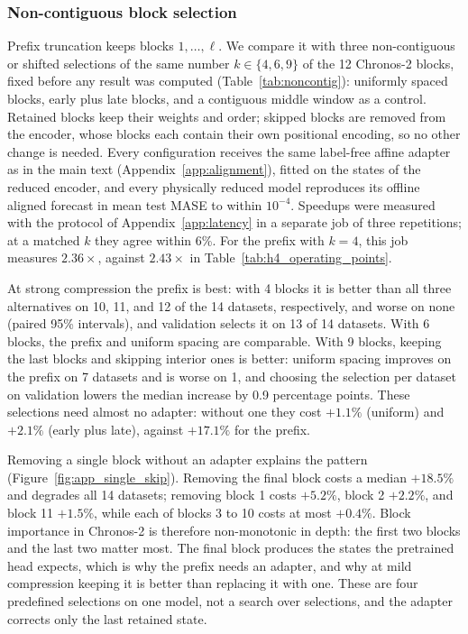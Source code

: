 
\subsubsection{Non-contiguous block selection}
\label{sec:app_noncontig}

Prefix truncation keeps blocks $1,\dots,\ell$. We compare it with three non-contiguous or shifted selections of the same number $k\in\{4,6,9\}$ of the 12 Chronos-2 blocks, fixed before any result was computed (Table~\ref{tab:noncontig}): uniformly spaced blocks, early plus late blocks, and a contiguous middle window as a control. Retained blocks keep their weights and order; skipped blocks are removed from the encoder, whose blocks each contain their own positional encoding, so no other change is needed. Every configuration receives the same label-free affine adapter as in the main text (Appendix~\ref{app:alignment}), fitted on the states of the reduced encoder, and every physically reduced model reproduces its offline aligned forecast in mean test MASE to within $10^{-4}$. Speedups were measured with the protocol of Appendix~\ref{app:latency} in a separate job of three repetitions; at a matched $k$ they agree within 6\%. For the prefix with $k=4$, this job measures $2.36\times$, against $2.43\times$ in Table~\ref{tab:h4_operating_points}.

At strong compression the prefix is best: with 4 blocks it is better than all three alternatives on 10, 11, and 12 of the 14 datasets, respectively, and worse on none (paired 95\% intervals), and validation selects it on 13 of 14 datasets. With 6 blocks, the prefix and uniform spacing are comparable. With 9 blocks, keeping the last blocks and skipping interior ones is better: uniform spacing improves on the prefix on 7 datasets and is worse on 1, and choosing the selection per dataset on validation lowers the median increase by 0.9 percentage points. These selections need almost no adapter: without one they cost $+1.1\%$ (uniform) and $+2.1\%$ (early plus late), against $+17.1\%$ for the prefix.

Removing a single block without an adapter explains the pattern (Figure~\ref{fig:app_single_skip}). Removing the final block costs a median $+18.5\%$ and degrades all 14 datasets; removing block 1 costs $+5.2\%$, block 2 $+2.2\%$, and block 11 $+1.5\%$, while each of blocks 3 to 10 costs at most $+0.4\%$. Block importance in Chronos-2 is therefore non-monotonic in depth: the first two blocks and the last two matter most. The final block produces the states the pretrained head expects, which is why the prefix needs an adapter, and why at mild compression keeping it is better than replacing it with one. These are four predefined selections on one model, not a search over selections, and the adapter corrects only the last retained state.

